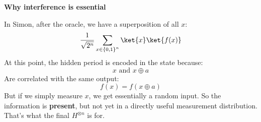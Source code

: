 \highspace
\begin{flushleft}
    \textcolor{Green3}{ \textbf{Why interference is essential}}
\end{flushleft}
In Simon, after the oracle, we have a superposition of all $x$:
\begin{equation*}
    \frac{1}{\sqrt{2^n}} \sum_{x \in \left\{0,1\right\}^n} \ket{x}\ket{f(x)}
\end{equation*}
At this point, the hidden period is encoded in the state because:
\begin{equation*}
    x \text{ and } x \oplus a
\end{equation*}
Are correlated with the same output:
\begin{equation*}
    f(x) = f(x \oplus a)
\end{equation*}
But if we simply measure $x$, we get essentially a random input. So the information is \textbf{present}, but not yet in a directly useful measurement distribution. That's what the final $H^{\otimes n}$ is for.


